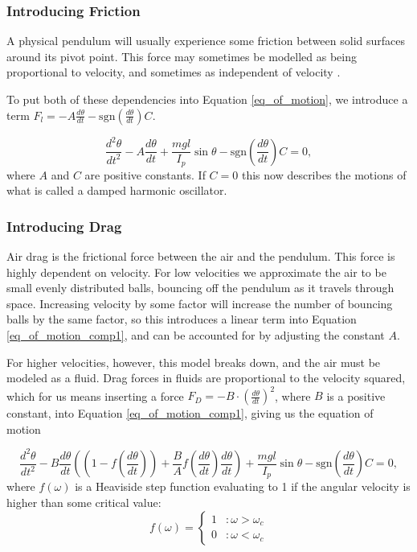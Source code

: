 \documentclass[11pt, a4paper]{article}
\begin{document}
\subsubsection{Introducing Friction}
A physical pendulum will usually experience some friction between solid
surfaces around its pivot point.
This force may sometimes be modelled as being proportional to velocity\cite[p. 30]{book},
and sometimes as independent of velocity \cite{friction}.


To put both of these dependencies into Equation \ref{eq_of_motion}, 
we introduce a term $F_l = -A \frac{d\theta}{dt} - \text{sgn}\left(\frac{d\theta}{dt}\right)C$. 

\begin{equation}
    \frac{d^2\theta}{dt^2} 
  - A \frac{d\theta}{dt}
  + \frac{mgl}{I_p}\sin{\theta} 
  - \text{sgn}(\frac{d\theta}{dt})C 
  = 0,
  \label{eq_of_motion_comp1}
\end{equation}
where $A$ and $C$ are positive constants.
If $C = 0$ this now describes the motions of what is 
called a damped harmonic oscillator\cite{osc}.

\subsubsection{Introducing Drag}
Air drag is the frictional force between the air and the pendulum. 
This force is highly dependent on velocity.
For low velocities we approximate the air to be small evenly distributed balls,
bouncing off the
pendulum as it travels through space. 
Increasing velocity by some factor will increase the number of bouncing balls by the same
factor, so this introduces a linear term into 
Equation \ref{eq_of_motion_comp1}, and can be accounted for by adjusting the constant
$A$.

For higher velocities, however, this model breaks down, and the air must be
modeled as a fluid. Drag forces in fluids are proportional to the velocity
squared\cite{drag}, which for us means inserting a force 
$F_D = -B\cdot \left(\frac{d\theta}{dt}\right)^2$, where $B$ is a positive constant,
into Equation \ref{eq_of_motion_comp1}, giving us the equation of motion

\begin{equation}
    \frac{d^2\theta}{dt^2} 
  - B \frac{d\theta}{dt}
  \left(\left( 1 -   f\left(\frac{d\theta}{dt}\right)   \right ) + \frac{B}{A}f\left(\frac{d\theta}{dt}\right) \frac{d\theta}{dt} \right)  
  + \frac{mgl}{I_p}\sin{\theta} 
  - \text{sgn}\left(\frac{d\theta}{dt}\right)C
  = 0,
  \label{eq_of_motion_comp2}
\end{equation}
where $f(\omega)$ is a Heaviside step function evaluating to 1 if the angular
velocity is higher than some critical value:
\begin{equation}
f(\omega) = \left\{
  \begin{array}{lr}
    1 & : \omega > \omega_{c}\\
    0 & : \omega < \omega_{c}
  \end{array}
\right.
\label{e:heaviside}
\end{equation}
\end{document}
